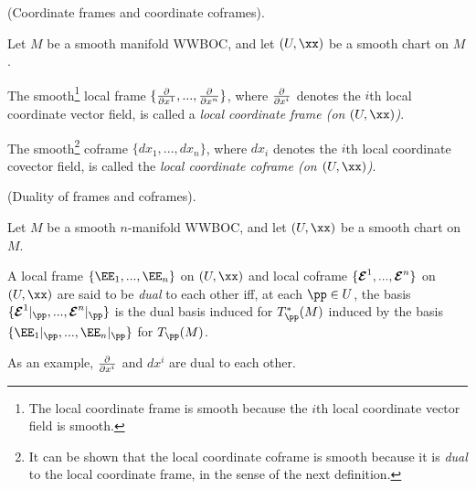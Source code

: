 \begin{defn}
\label{ch::manifolds::defn::coordinate_frames_coframes}
     (Coordinate frames and coordinate coframes).
    
    Let $M$ be a smooth manifold WWBOC, and let $(U, \xx)$ be a smooth chart on $M$.
    
    The smooth\footnote{The local coordinate frame is smooth because the $i$th local coordinate vector field is smooth.} local frame $\{\frac{\partial}{\partial x^1}, ..., \frac{\partial}{\partial x^n} \}$, where $\frac{\partial}{\partial x^i}$ denotes the $i$th local coordinate vector field, is called a \textit{local coordinate frame (on $(U, \xx)$)}.
    
    The smooth\footnote{It can be shown that the local coordinate coframe is smooth because it is \textit{dual} to the local coordinate frame, in the sense of the next definition.} coframe $\{dx_1, ..., dx_n\}$, where $dx_i$ denotes the $i$th local coordinate covector field, is called the \textit{local coordinate coframe (on $(U, \xx)$)}.
\end{defn}

\begin{defn}
     (Duality of frames and coframes).

    Let $M$ be a smooth $n$-manifold WWBOC, and let $(U, \xx)$ be a smooth chart on $M$.
    
    A local frame $\{\EE_1, ..., \EE_n\}$ on $(U, \xx)$ and local coframe $\{\boldsymbol{\mathcal{E}}^1, ..., \boldsymbol{\mathcal{E}}^n\}$ on $(U, \xx)$ are said to be \textit{dual} to each other iff, at each $\pp \in U$, the basis $\{\EEE^1|_\pp, ..., \EEE^n|_\pp\}$ is the dual basis induced for $T_\pp^*(M)$ induced by the basis $\{\EE_1|_\pp, ..., \EE_n|_\pp\}$ for $T_\pp(M)$. 
    
    As an example, $\frac{\partial}{\partial x^i}$ and $dx^i$ are dual to each other.
\end{defn}



    

